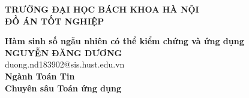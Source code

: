 \documentclass[main.tex]{subfiles}
\begin{document}
\begin{titlepage}
\thispagestyle{empty}
\begin{center}

{\textbf{\large{TRƯỜNG ĐẠI HỌC BÁCH KHOA HÀ NỘI}}}\\[4cm]

{\textbf{\huge{ ĐỒ ÁN TỐT NGHIỆP}}}\\[1cm]
{\textbf{\Large{Hàm sinh số ngẫu nhiên có thể kiểm chứng và ứng dụng}}\\[1cm]

{\textbf{\large{NGUYỄN ĐĂNG DƯƠNG}}}\\
{\large{duong.nd183902@sis.hust.edu.vn}}\\[0.5cm]

{\textbf{\large{Ngành Toán Tin}}}\\
{\textbf{\large{Chuyên sâu Toán ứng dụng}}}\\

\vspace{2cm}
\begin{table}[H]
\centering
{}
\end{table}}
\end{center}



\end{titlepage}
\end{document}
